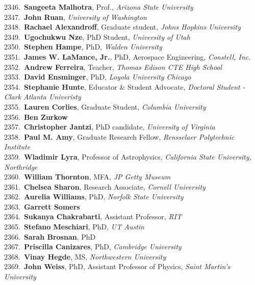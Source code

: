 2346.~{\bf Sangeeta Malhotra}, Prof., {\sl Arizona State University} \\
2347.~{\bf John Ruan}, {\sl University of Washington} \\
2348.~{\bf Rachael Alexandroff}, Graduate student, {\sl Johns Hopkins University} \\
2349.~{\bf Ugochukwu Nze}, PhD Student, {\sl University of Utah} \\
2350.~{\bf Stephen Hampe}, PhD, {\sl Walden University} \\
2351.~{\bf James W. LaMance, Jr.}, PhD, Aerospace Engineering, {\sl Constell, Inc.} \\
2352.~{\bf Andrew Ferreira}, Teacher, {\sl Thomas Edison CTE High School} \\
2353.~{\bf David Ensminger}, PhD, {\sl Loyola University Chicago} \\
2354.~{\bf Stephanie Hunte}, Educator \& Student Advocate, {\sl Doctoral Student - Clark Atlanta Univeristy} \\
2355.~{\bf Lauren Corlies}, Graduate Student, {\sl Columbia University} \\
2356.~{\bf Ben Zurkow} \\
2357.~{\bf Christopher Jantzi}, PhD candidate, {\sl University of Virginia} \\
2358.~{\bf Paul M. Amy}, Graduate Research Fellow, {\sl Rensselaer Polytechnic Institute} \\
2359.~{\bf Wladimir Lyra}, Professor of Astrophysics, {\sl California State University, Northridge} \\
2360.~{\bf William Thornton}, MFA, {\sl JP Getty Museum} \\
2361.~{\bf Chelsea Sharon}, Research Associate, {\sl Cornell University} \\
2362.~{\bf Aurelia Williams}, PhD, {\sl Norfolk State University } \\
2363.~{\bf Garrett Somers} \\
2364.~{\bf Sukanya Chakrabarti}, Assistant Professor, {\sl RIT} \\
2365.~{\bf Stefano Meschiari}, PhD, {\sl UT Austin} \\
2366.~{\bf Sarah Brosnan}, PhD \\
2367.~{\bf Priscilla Canizares}, PhD, {\sl Cambridge University} \\
2368.~{\bf Vinay Hegde}, MS, {\sl Northwestern University} \\
2369.~{\bf John Weiss}, PhD, Assistant Professor of Physics, {\sl Saint Martin's University} \\
